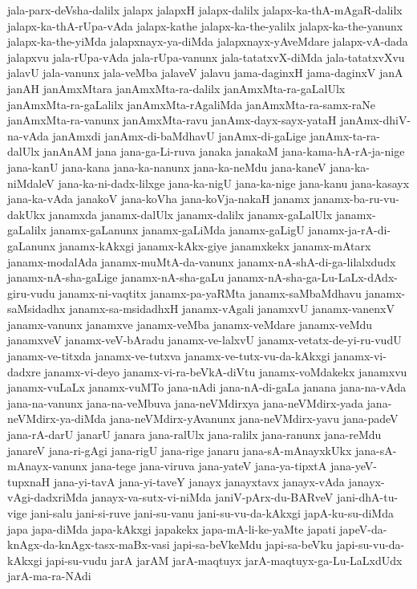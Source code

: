 {jala-parx-deVsha-dalilx
jalapx
jalapxH
jalapx-dalilx
jalapx-ka-thA-mAgaR-dalilx
jalapx-ka-thA-rUpa-vAda
jalapx-kathe
jalapx-ka-the-yalilx
jalapx-ka-the-yanunx
jalapx-ka-the-yiMda
jalapxnayx-ya-diMda
jalapxnayx-yAveMdare
jalapx-vA-dada
jalapxvu
jala-rUpa-vAda
jala-rUpa-vanunx
jala-tatatxvX-diMda
jala-tatatxvXvu
jalavU
jala-vanunx
jala-veMba
jalaveV
jalavu
jama-daginxH
jama-daginxV
janA
janAH
janAmxMtara
janAmxMta-ra-dalilx
janAmxMta-ra-gaLalUlx
janAmxMta-ra-gaLalilx
janAmxMta-rAgaliMda
janAmxMta-ra-samx-raNe
janAmxMta-ra-vanunx
janAmxMta-ravu
janAmx-dayx-sayx-yataH
janAmx-dhiV-na-vAda
janAmxdi
janAmx-di-baMdhavU
janAmx-di-gaLige
janAmx-ta-ra-dalUlx
janAnAM
jana
jana-ga-Li-ruva
janaka
janakaM
jana-kama-hA-rA-ja-nige
jana-kanU
jana-kana
jana-ka-nanunx
jana-ka-neMdu
jana-kaneV
jana-ka-niMdaleV
jana-ka-ni-dadx-lilxge
jana-ka-nigU
jana-ka-nige
jana-kanu
jana-kasayx
jana-ka-vAda
janakoV
jana-koVha
jana-koVja-nakaH
janamx
janamx-ba-ru-vu-dakUkx
janamxda
janamx-dalUlx
janamx-dalilx
janamx-gaLalUlx
janamx-gaLalilx
janamx-gaLanunx
janamx-gaLiMda
janamx-gaLigU
janamx-ja-rA-di-gaLanunx
janamx-kAkxgi
janamx-kAkx-giye
janamxkekx
janamx-mAtarx
janamx-modalAda
janamx-muMtA-da-vanunx
janamx-nA-shA-di-ga-lilalxdudx
janamx-nA-sha-gaLige
janamx-nA-sha-gaLu
janamx-nA-sha-ga-Lu-LaLx-dAdx-giru-vudu
janamx-ni-vaqtitx
janamx-pa-yaRMta
janamx-saMbaMdhavu
janamx-saMsidadhx
janamx-sa-msidadhxH
janamx-vAgali
janamxvU
janamx-vanenxV
janamx-vanunx
janamxve
janamx-veMba
janamx-veMdare
janamx-veMdu
janamxveV
janamx-veV-bAradu
janamx-ve-lalxvU
janamx-vetatx-de-yi-ru-vudU
janamx-ve-titxda
janamx-ve-tutxva
janamx-ve-tutx-vu-da-kAkxgi
janamx-vi-dadxre
janamx-vi-deyo
janamx-vi-ra-beVkA-diVtu
janamx-voMdakekx
janamxvu
janamx-vuLaLx
janamx-vuMTo
jana-nAdi
jana-nA-di-gaLa
janana
jana-na-vAda
jana-na-vanunx
jana-na-veMbuva
jana-neVMdirxya
jana-neVMdirx-yada
jana-neVMdirx-ya-diMda
jana-neVMdirx-yAvanunx
jana-neVMdirx-yavu
jana-padeV
jana-rA-darU
janarU
janara
jana-ralUlx
jana-ralilx
jana-ranunx
jana-reMdu
janareV
jana-ri-gAgi
jana-rigU
jana-rige
janaru
jana-sA-mAnayxkUkx
jana-sA-mAnayx-vanunx
jana-tege
jana-viruva
jana-yateV
jana-ya-tipxtA
jana-yeV-tupxnaH
jana-yi-tavA
jana-yi-taveY
janayx
janayxtavx
janayx-vAda
janayx-vAgi-dadxriMda
janayx-va-sutx-vi-niMda
janiV-pArx-du-BARveV
jani-dhA-tu-vige
jani-salu
jani-si-ruve
jani-su-vanu
jani-su-vu-da-kAkxgi
japA-ku-su-diMda
japa
japa-diMda
japa-kAkxgi
japakekx
japa-mA-li-ke-yaMte
japati
japeV-da-knAgx-da-knAgx-tasx-maBx-vasi
japi-sa-beVkeMdu
japi-sa-beVku
japi-su-vu-da-kAkxgi
japi-su-vudu
jarA
jarAM
jarA-maqtuyx
jarA-maqtuyx-ga-Lu-LaLxdUdx
jarA-ma-ra-NAdi
}
